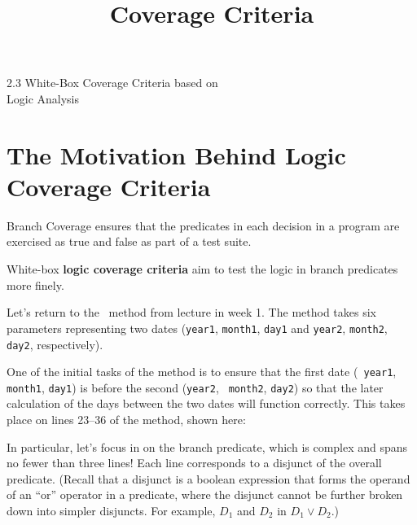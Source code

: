 



\title{Coverage Criteria}{2.3 White-Box Coverage Criteria based on\\ Logic Analysis}

\section{The Motivation Behind Logic Coverage Criteria}


Branch Coverage ensures that the predicates in each decision in a program are
exercised as true and false as part of a test suite. 

White-box {\bf logic coverage criteria} aim to test the logic in branch
predicates more finely.



Let's return to the \daysbetweentwodatesmethod~method from lecture in week 1.
The method takes six parameters representing two dates ({\tt year1},
{\tt month1}, {\tt day1} and {\tt year2}, {\tt month2}, {\tt day2},
respectively).

One of the initial tasks of the method is to ensure that the first date ({\tt
year1}, {\tt month1}, {\tt day1}) is before the second ({\tt year2}, {\tt
month2}, {\tt day2}) so that the later calculation of the days between the two
dates will function correctly. This takes place on lines 23--36 of the method,
shown here:

\begin{center} 
\end{center}    

In particular, let's focus in on the branch predicate, which is complex and
spans no fewer than three lines! Each line corresponds to a disjunct of the
overall predicate.
%
(Recall that a disjunct is a boolean expression that forms the operand of an
``or'' operator in a predicate, where the disjunct  cannot be further broken
down into simpler disjuncts. For example, $D_1$ and $D_2$ in $D_1 \vee D_2$.)


